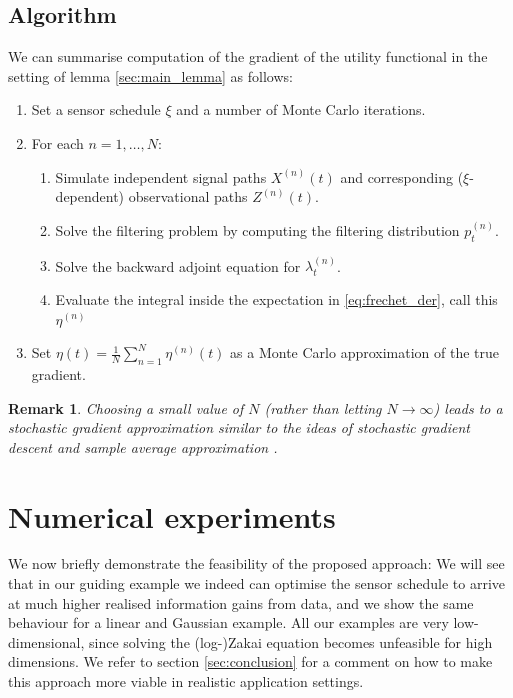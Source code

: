 \documentclass[10pt]{article}
\numberwithin{equation}{section}
\numberwithin{figure}{section}
\newtheorem{rem}[thm]{Remark}
\theoremstyle{remark}
\begin{document}
\subsection{Algorithm}
    We can summarise computation of the gradient of the utility functional in the setting of lemma \ref{sec:main_lemma} as follows:
    \begin{enumerate}
        \item Set a sensor schedule $\xi$ and a number of Monte Carlo iterations.
        \item For each $n=1,\ldots, N$:
        \begin{enumerate}
        \item Simulate independent signal paths $X^{(n)}(t)$ and corresponding ($\xi$-dependent) observational paths $Z^{(n)}(t)$.
        \item Solve the filtering problem by computing the filtering distribution $p^{(n)}_t$.
        \item Solve the backward adjoint equation for $\lambda_t^{(n)}$.
        \item Evaluate the integral inside the expectation in \eqref{eq:frechet_der}, call this $\eta^{(n)}$
        \end{enumerate}        
        \item Set $\eta(t) = \frac{1}{N}\sum_{n=1}^N \eta^{(n)}(t)$ as a Monte Carlo approximation of the true gradient.
    \end{enumerate}

\begin{rem}\label{rem:SGD}
    Choosing a small value of $N$ (rather than letting $N\to \infty$) leads to a stochastic gradient approximation similar to the ideas of stochastic gradient descent \cite{kiefer1952stochastic,latz2021analysis} and sample average approximation \cite{kim2014guide,kleywegt2002sample}.
\end{rem}

\section{Numerical experiments}\label{sec:numerics}
We now briefly demonstrate the feasibility of the proposed approach: We will see that in our guiding example we indeed can optimise the sensor schedule to arrive at much higher realised information gains from data, and we show the same behaviour for a linear and Gaussian example. All our examples are very low-dimensional, since solving the (log-)Zakai equation becomes unfeasible for high dimensions. We refer to section \ref{sec:conclusion} for a comment on how to make this approach more viable in realistic application settings.
\end{document}
